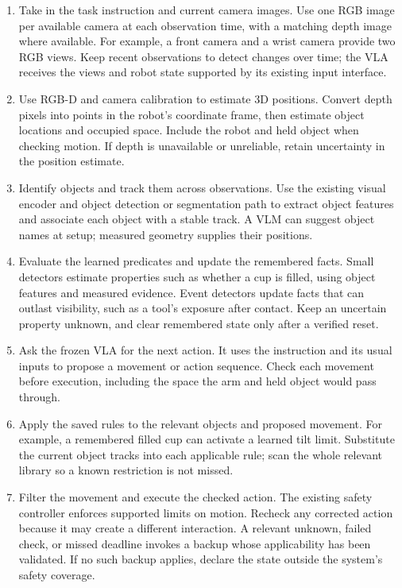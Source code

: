 \documentclass[10pt]{article}
\begin{document}
\begin{enumerate}[itemsep=6pt]
\item Take in the task instruction and current camera images. Use one RGB image per available camera at each observation time, with a matching depth image where available. For example, a front camera and a wrist camera provide two RGB views. Keep recent observations to detect changes over time; the VLA receives the views and robot state supported by its existing input interface.

\item Use RGB-D and camera calibration to estimate 3D positions. Convert depth pixels into points in the robot's coordinate frame, then estimate object locations and occupied space. Include the robot and held object when checking motion. If depth is unavailable or unreliable, retain uncertainty in the position estimate.

\item Identify objects and track them across observations. Use the existing visual encoder and object detection or segmentation path to extract object features and associate each object with a stable track. A VLM can suggest object names at setup; measured geometry supplies their positions.

\item Evaluate the learned predicates and update the remembered facts. Small detectors estimate properties such as whether a cup is filled, using object features and measured evidence. Event detectors update facts that can outlast visibility, such as a tool's exposure after contact. Keep an uncertain property unknown, and clear remembered state only after a verified reset.

\item Ask the frozen VLA for the next action. It uses the instruction and its usual inputs to propose a movement or action sequence. Check each movement before execution, including the space the arm and held object would pass through.

\item Apply the saved rules to the relevant objects and proposed movement. For example, a remembered filled cup can activate a learned tilt limit. Substitute the current object tracks into each applicable rule; scan the whole relevant library so a known restriction is not missed.

\item Filter the movement and execute the checked action. The existing safety controller enforces supported limits on motion. Recheck any corrected action because it may create a different interaction. A relevant unknown, failed check, or missed deadline invokes a backup whose applicability has been validated. If no such backup applies, declare the state outside the system's safety coverage.


\end{enumerate}
\end{document}
